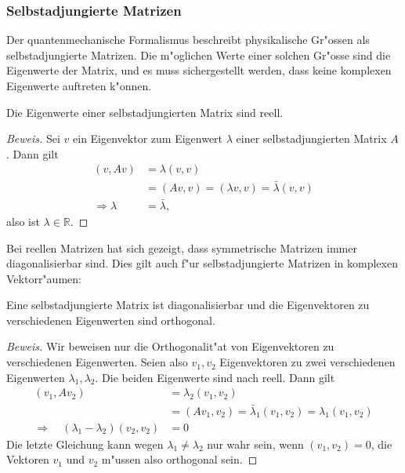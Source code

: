 \subsubsection{Selbstadjungierte Matrizen}
Der quantenmechanische Formalismus beschreibt physikalische Gr"ossen
als selbstadjungierte Matrizen. Die m"oglichen Werte einer solchen Gr"osse
sind die Eigenwerte der Matrix, und es muss sichergestellt werden,
dass keine komplexen Eigenwerte auftreten k"onnen.

\begin{satz}
\label{skript:ewreell}
Die Eigenwerte einer selbstadjungierten Matrix sind reell.
\end{satz}
\begin{proof}[Beweis]
Sei $v$ ein Eigenvektor zum Eigenwert $\lambda$ einer selbstadjungierten
Matrix $A$. Dann gilt
\begin{align*}
(v,Av)
&=
\lambda(v,v)
\\
&=(Av,v)=(\lambda v,v)=\bar\lambda(v,v)
\\
\Rightarrow \lambda&=\bar\lambda,
\end{align*}
also ist $\lambda\in\mathbb R$.
\end{proof}

Bei reellen Matrizen hat sich gezeigt, dass symmetrische Matrizen immer
diagonalisierbar sind. Dies gilt auch f"ur selbstadjungierte Matrizen
in komplexen Vektorr"aumen:

\begin{satz}
Eine selbstadjungierte Matrix ist diagonalisierbar und die Eigenvektoren zu
verschiedenen Eigenwerten sind orthogonal.
\end{satz}

\begin{proof}[Beweis]
Wir beweisen nur die Orthogonalit"at von Eigenvektoren zu verschiedenen 
Eigenwerten. Seien also $v_1,v_2$ Eigenvektoren zu zwei verschiedenen
Eigenwerten $\lambda_1,\lambda_2$. Die beiden Eigenwerte sind nach
\label{skript:ewreell} reell. Dann gilt
\begin{align*}
(v_1,Av_2)&=\lambda_2(v_1,v_2)
\\
          &=(Av_1,v_2)=\bar\lambda_1(v_1,v_2)=\lambda_1(v_1,v_2)
\\
\Rightarrow\quad
(\lambda_1-\lambda_2)(v_2,v_2)&=0
\end{align*}
Die letzte Gleichung kann wegen $\lambda_1\ne\lambda_2$ nur wahr sein,
wenn $(v_1,v_2)=0$, die Vektoren $v_1$ und $v_2$ m"ussen also orthogonal sein.
\end{proof}

